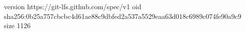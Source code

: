 version https://git-lfs.github.com/spec/v1
oid sha256:0b25a757cbcbc4d61ae88c9dbfed2a537a5529eaa63d018c6989c074fe90a9c9
size 1126
